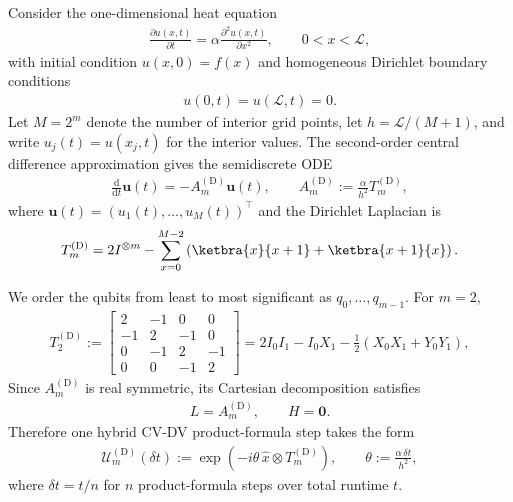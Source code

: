 \documentclass{article}
\newcommand{\dd}{\mathrm{d}}
\begin{document}
Consider the one-dimensional heat equation
\begin{align}
    \frac{\partial u(x,t)}{\partial t} = \alpha \frac{\partial^2 u(x,t)}{\partial x^2},
    \qquad 0 < x < \mathcal{L},
\end{align}
with initial condition $u(x,0)=f(x)$ and homogeneous Dirichlet boundary conditions
\begin{align}
    u(0,t)=u(\mathcal{L},t)=0.
\end{align}
Let $M=2^m$ denote the number of interior grid points, let $h=\mathcal{L}/(M+1)$, and write $u_j(t)=u(x_j,t)$ for the interior values. The second-order central difference approximation gives the semidiscrete ODE
\begin{align}
    \frac{\dd}{\dd t}\bm{u}(t) = -A_m^{(\mathrm D)} \bm{u}(t),
    \qquad
    A_m^{(\mathrm D)} := \frac{\alpha}{h^2}T_m^{(\mathrm D)},
\end{align}
where $\bm{u}(t)=(u_1(t),\dots,u_M(t))^\top$ and the Dirichlet Laplacian is
\begin{align}
    T_m^{(\mathrm D)}
    =
    2I^{\otimes m}
    -
    \sum_{x=0}^{M-2}\left(\ketbra{x}{x+1}+\ketbra{x+1}{x}\right).
\end{align}

We order the qubits from least to most significant as $q_0,\dots,q_{m-1}$. For $m=2$,
\begin{align}
    T_2^{(\mathrm D)}
    :=
    \begin{bmatrix}
        2 & -1 & 0 & 0 \\
        -1 & 2 & -1 & 0 \\
        0 & -1 & 2 & -1 \\
        0 & 0 & -1 & 2
    \end{bmatrix}
    =
    2 I_0 I_1 - I_0 X_1 - \frac{1}{2}\left(X_0X_1 + Y_0Y_1\right),
\end{align}
Since $A_m^{(\mathrm D)}$ is real symmetric, its Cartesian decomposition satisfies
\begin{align}
    L = A_m^{(\mathrm D)},
    \qquad
    H = \mathbf{0}.
\end{align}
Therefore one hybrid CV-DV product-formula step takes the form
\begin{align}
    \mathcal U_m^{(\mathrm D)}(\delta t)
    :=
    \exp\!\left(-i\theta\,\hat x \otimes T_m^{(\mathrm D)}\right),
    \qquad
    \theta := \frac{\alpha\,\delta t}{h^2},
\end{align}
where $\delta t=t/n$ for $n$ product-formula steps over total runtime $t$.
\end{document}

